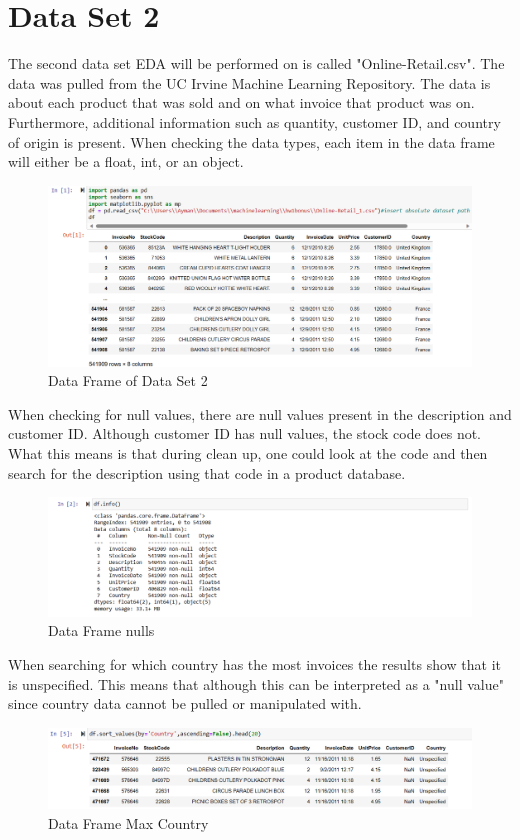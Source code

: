 \documentclass{article}
\begin{document}
\section{Data Set 2}
The second data set EDA will be performed on is called "Online-Retail.csv". 
The data was pulled from the UC Irvine Machine Learning Repository. The data is about each product that was sold and on what invoice that product was on. Furthermore, additional information such as quantity, customer ID, and country of origin is present. When checking the data types, each item in the data frame will either be a float, int, or an object. 
\begin{figure}
    \centering
    \includegraphics[width=0.5\linewidth]{a.png}
    \caption{Data Frame of Data Set 2}
    \label{fig:enter-label}
\end{figure}
When checking for null values, there are null values present in the description and customer ID. Although customer ID has null values, the stock code does not. What this means is that during clean up, one could look at the code and then search for the description using that code in a product database. 
\begin{figure}
    \centering
    \includegraphics[width=0.5\linewidth]{b.png}
    \caption{Data Frame nulls}
    \label{fig:enter-label}
\end{figure}
When searching for which country has the most invoices the results show that it is unspecified. This means that although this can be interpreted as a "null value" since country data cannot be pulled or manipulated with.
\begin{figure}
    \centering
    \includegraphics[width=0.5\linewidth]{c.png}
    \caption{Data Frame Max Country}
    \label{fig:enter-label}
\end{figure}
\end{document}
